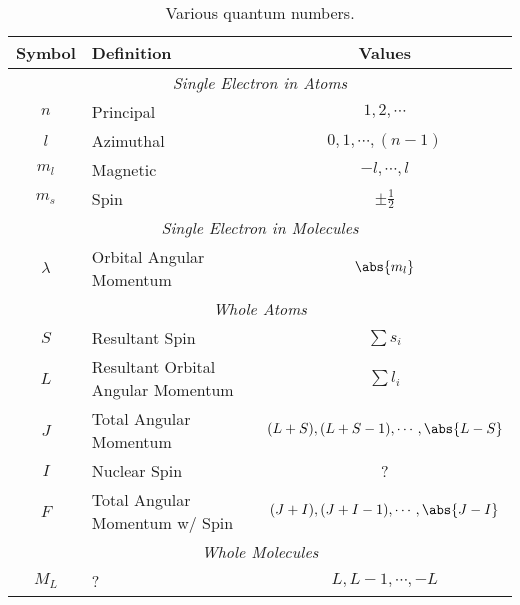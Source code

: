 \documentclass[11pt, twoside, fleqn]{report}
\begin{document}
\begin{table}[H]
    \centering
    \caption{Various quantum numbers.}
    \label{t:quantum_numbers}
    \begin{tabular}{clc}
        \toprule
        Symbol    & Definition                            & Values                                      \\
        \midrule
        \multicolumn{3}{c}{\textit{Single Electron in Atoms}}                                           \\
        \cmidrule(lr){1-3}
        $n$       & Principal                             & $1, 2, \dotsb$                              \\
        $l$       & Azimuthal                             & $0, 1, \dotsb, (n - 1)$                     \\
        $m_l$     & Magnetic                              & $-l, \dotsb, l$                             \\
        $m_s$     & Spin                                  & $\pm \frac{1}{2}$                           \\
        \multicolumn{3}{c}{\textit{Single Electron in Molecules}}                                       \\
        \cmidrule(lr){1-3}
        $\lambda$ & Orbital Angular Momentum              & $\abs{m_l}$                                 \\
        \multicolumn{3}{c}{\textit{Whole Atoms}}                                                        \\
        \cmidrule(lr){1-3}
        $S$       & Resultant Spin                        & $\sum s_i$                                  \\
        $L$       & Resultant Orbital Angular Momentum    & $\sum l_i$                                  \\
        $J$       & Total Angular Momentum                & $(L + S), (L + S - 1), \dotsb, \abs{L - S}$ \\
        $I$       & Nuclear Spin                          & ?                                           \\
        $F$       & Total Angular Momentum w/ Spin        & $(J + I), (J + I - 1), \dotsb, \abs{J - I}$ \\
        \multicolumn{3}{c}{\textit{Whole Molecules}}                                                    \\
        \cmidrule(lr){1-3}
        $M_L$     & ?                                     & $L, L - 1, \dotsb, -L$                      \\

\end{tabular}
\end{table}
\end{document}
